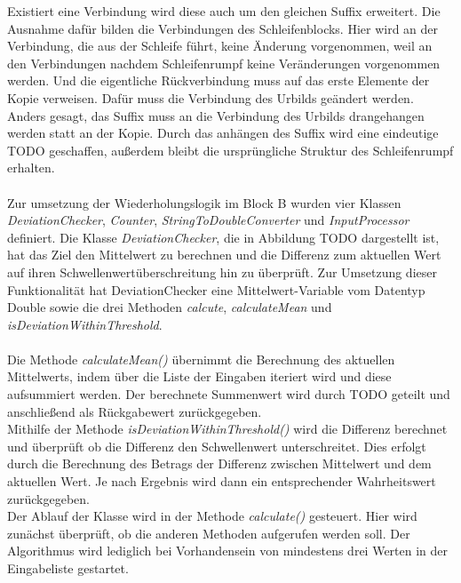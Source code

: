     Existiert eine Verbindung wird diese auch um den gleichen Suffix erweitert.
    Die Ausnahme dafür bilden die Verbindungen des Schleifenblocks.
    Hier wird an der Verbindung, die aus der Schleife führt, keine Änderung vorgenommen, weil an den Verbindungen nachdem Schleifenrumpf keine Veränderungen vorgenommen werden.
    Und die eigentliche Rückverbindung muss auf das erste Elemente der Kopie verweisen. 
    Dafür muss die Verbindung des Urbilds geändert werden.
    Anders gesagt, das Suffix muss an die Verbindung des Urbilds drangehangen werden statt an der Kopie.
    Durch das anhängen des Suffix wird eine eindeutige TODO geschaffen, außerdem bleibt die ursprüngliche Struktur des Schleifenrumpf erhalten.\\
    \\ 
    Zur umsetzung der Wiederholungslogik im Block B wurden vier Klassen \textit{DeviationChecker}, \textit{Counter}, \textit{StringToDoubleConverter} und \textit{InputProcessor} definiert.
    Die Klasse \textit{DeviationChecker}, die in Abbildung TODO dargestellt ist, hat das Ziel den Mittelwert zu berechnen und die Differenz zum aktuellen Wert auf ihren Schwellenwertüberschreitung hin zu überprüft.
    Zur Umsetzung dieser Funktionalität hat DeviationChecker eine Mittelwert-Variable vom Datentyp Double sowie die drei Methoden \textit{calcute}, \textit{calculateMean} und \textit{isDeviationWithinThreshold}.\\
    \\
    Die Methode \textit{calculateMean()} übernimmt die Berechnung des aktuellen Mittelwerts, indem über die Liste der Eingaben iteriert wird und diese aufsummiert werden.
    Der berechnete Summenwert wird durch TODO geteilt und anschließend als Rückgabewert zurückgegeben.\\
    Mithilfe der Methode \textit{isDeviationWithinThreshold()} wird die Differenz berechnet und überprüft ob die Differenz den Schwellenwert unterschreitet.
    Dies erfolgt durch die Berechnung des Betrags der Differenz zwischen Mittelwert und dem aktuellen Wert.
    Je nach Ergebnis wird dann ein entsprechender Wahrheitswert zurückgegeben.\\
    Der Ablauf der Klasse wird in der Methode \textit{calculate()} gesteuert. Hier wird zunächst überprüft, ob die anderen Methoden aufgerufen werden soll.
    Der Algorithmus wird lediglich bei Vorhandensein von mindestens drei Werten in der Eingabeliste gestartet.
